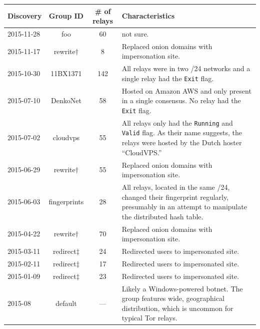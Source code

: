 \begin{table}[t]
\centering
\begin{tabular}{l c c p{10cm}}
\textbf{Discovery} & \textbf{Group ID} & \textbf{\# of relays} & \textbf{Characteristics} \\
\hline
2015-11-28 & foo & 60 & not sure. \\

2015-11-17 & rewrite$\dagger$ & 8 & Replaced onion domains with impersonation site. \\

2015-10-30 & 11BX1371 & 142 & All relays were in two /24 networks and a single
relay had the \texttt{Exit} flag.  \\

2015-07-10 & DenkoNet & 58 & Hosted on Amazon AWS and only present in a single
consensus.  No relay had the \texttt{Exit} flag. \\

2015-07-02 & cloudvps & 55 & All relays only had the \texttt{Running} and
\texttt{Valid} flag.  As their name suggests, the relays were hosted by
the Dutch hoster ``CloudVPS.'' \\

2015-06-29 & rewrite$\dagger$ & 55 & Replaced onion domains with impersonation site. \\


2015-06-03 & fingerprints & 28 & All relays, located in the same /24, changed
their fingerprint regularly, presumably in an attempt to manipulate the
distributed hash table. \\

2015-04-22 & rewrite$\dagger$ & 70 & Replaced onion domains with impersonation site. \\

2015-03-11 & redirect$\ddagger$ & 24 & Redirected users to impersonated site. \\
2015-02-11 & redirect$\ddagger$ & 17 & Redirected users to impersonated site. \\
2015-01-09 & redirect$\ddagger$ & 23 & Redirected users to impersonated site. \\

2015-08 & default & --- & Likely a Windows-powered botnet.  The group
features wide, geographical distribution, which is uncommon for typical Tor
relays. \\


\end{tabular}
\end{table}
